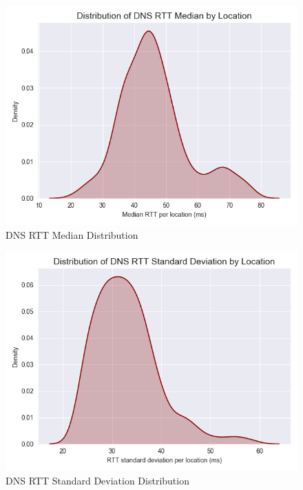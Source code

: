 \begin{figure}[H]
    \centering
    \includegraphics[width=\textwidth]{images/dns/dist_raw_data/dns_rtt_median_distribution.png}
    \caption{DNS RTT Median Distribution}
    \label{fig:dns_analytics_median_dist}
\end{figure}

\begin{figure}[H]
    \centering
    \includegraphics[width=\textwidth]{images/dns/dist_raw_data/dns_rtt_stdev_distribution.png}
    \caption{DNS RTT Standard Deviation Distribution}
    \label{fig:dns_analytics_stdev_dist}
\end{figure}

